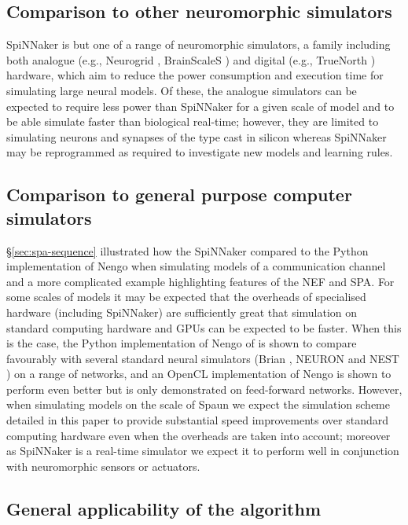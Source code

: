\documentclass[conference]{IEEEtran}
\begin{document}
  \subsection{Comparison to other neuromorphic simulators}

  SpiNNaker is but one of a range of neuromorphic simulators, a family including both analogue (e.g., Neurogrid \parencite{Benjamin2014}, BrainScaleS \parencite{Schemmel2010}) and digital (e.g., TrueNorth \parencite{Merolla2014}) hardware, which aim to reduce the power consumption and execution time for simulating large neural models.
  Of these, the analogue simulators can be expected to require less power than SpiNNaker for a given scale of model \parencite{Stromatias2013} and to be able simulate faster than biological real-time; however, they are limited to simulating neurons and synapses of the type cast in silicon whereas SpiNNaker may be reprogrammed as required to investigate new models and learning rules.

  \subsection{Comparison to general purpose computer simulators}

  \S\ref{sec:spa-sequence} illustrated how the SpiNNaker compared to the Python implementation of Nengo when simulating models of a communication channel and a more complicated example highlighting features of the NEF and SPA.
  For some scales of models it may be expected that the overheads of specialised hardware (including SpiNNaker) are sufficiently great that simulation on standard computing hardware and GPUs can be expected to be faster.
  When this is the case, the Python implementation of Nengo of \textcite[\S6]{Bekolay2014} is shown to compare favourably with several standard neural simulators (Brian \parencite{Goodman2009}, NEURON \parencite{carnevale2006neuron} and NEST \parencite{Gewaltig2007}) on a range of networks, and an OpenCL implementation of Nengo is shown to perform even better but is only demonstrated on feed-forward networks.
  However, when simulating models on the scale of Spaun we expect the simulation scheme detailed in this paper to provide substantial speed improvements over standard computing hardware even when the overheads are taken into account; moreover as SpiNNaker is a real-time simulator we expect it to perform well in conjunction with neuromorphic sensors or actuators.

  \subsection{General applicability of the algorithm}
\end{document}
